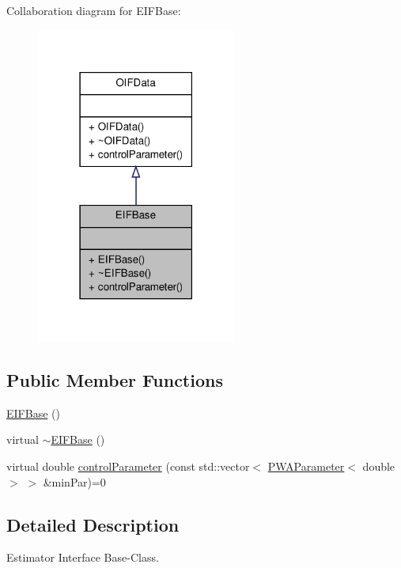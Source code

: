 Collaboration diagram for EIFBase:\nopagebreak
\begin{figure}[H]
\begin{center}
\leavevmode
\includegraphics[width=186pt]{db/da5/classEIFBase__coll__graph}
\end{center}
\end{figure}
\subsection*{Public Member Functions}
\begin{DoxyCompactItemize}
\item 
\hyperlink{classEIFBase_a8b6ea6ef6b90d40293b55a71249cb5f0}{EIFBase} ()
\item 
virtual \hyperlink{classEIFBase_ae4253811072d1d4251a009bda238f450}{$\sim$EIFBase} ()
\item 
virtual double \hyperlink{classEIFBase_a85937003fd68b507ddc99bfcee3a4b27}{controlParameter} (const std::vector$<$ \hyperlink{classPWAParameter}{PWAParameter}$<$ double $>$ $>$ \&minPar)=0
\end{DoxyCompactItemize}


\subsection{Detailed Description}
Estimator Interface Base-\/Class. 

